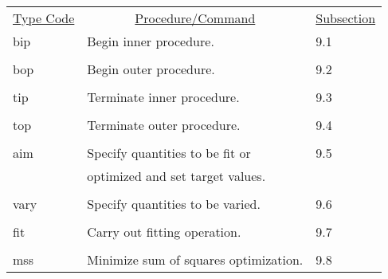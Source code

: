 \begin{center}
\begin{tabular}{lll}
\multicolumn{1}{c}{\underline {Type Code}} &
\multicolumn{1}{c}{\underline{Procedure/Command}}   &
\multicolumn{1}{c}{\underline{Subsection}} \\
\hspace{1.5em}bip    &     Begin inner procedure.        &    \hspace{2em}9.1\\
\vspace{-3mm}& &\\
\hspace{1.5em}bop    &     Begin outer procedure.        &       \hspace{2em}9.2\\
\vspace{-3mm}& &\\
\hspace{1.5em}tip    &     Terminate inner procedure.    &       \hspace{2em}9.3\\
\vspace{-3mm}& &\\
\hspace{1.5em}top    &     Terminate outer procedure.      &     \hspace{2em}9.4\\
\vspace{-3mm}& &\\
\hspace{1.5em}aim    &     Specify quantities to be fit or  &  \hspace{2em}9.5\\
           &   optimized and set target values. &\\
\vspace{-3mm}& &\\
\hspace{1.5em}vary   &     Specify quantities to be varied.  &    \hspace{2em}9.6\\
\vspace{-3mm}& &\\
\hspace{1.5em}fit    &     Carry out fitting operation.    &    \hspace{2em}9.7\\
\vspace{-3mm}& &\\
\hspace{1.5em}mss    &  Minimize sum of squares optimization. & \hspace{2em}9.8\\

\end{tabular}
\end{center}
